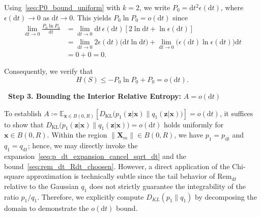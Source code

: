 \documentclass[
 longbibliography,
 twocolumn,
 superscriptaddress,
 amsmath,
 amssymb,
 amsthm,
 amsfonts,
 prl,
 floatfix,
]{revtex4-2}
\begin{document}
\begin{widetext}
Using~\eqref{seq:P0_bound_uniform} with $k=2$, we write $P_0=\mathrm dt^2\epsilon(\mathrm dt)$, where $\epsilon(\mathrm dt)\rightarrow0$ as $\mathrm dt\rightarrow 0$.
This yields $P_0\ln P_0=o(\mathrm dt)$ since
\begin{equation}
\begin{aligned}
    \lim_{\mathrm dt\rightarrow 0}
    \frac{P_0\ln P_0}{\mathrm dt}
    &=\lim_{\mathrm dt\rightarrow 0}
    \mathrm dt\,\epsilon(\mathrm dt)
    \left[2\ln\mathrm dt+\ln\epsilon(\mathrm dt)\right]
    \\
    &=\lim_{\mathrm dt\rightarrow 0}
    2\epsilon(\mathrm dt)\big(\mathrm dt\ln\mathrm dt)
    +\lim_{\mathrm dt\rightarrow 0}
    \big(\epsilon(\mathrm dt)\ln\epsilon(\mathrm dt)\big)\mathrm dt
    \\
    &=0+0=0.
    \label{seq:P0lnP0_odt}
\end{aligned}
\end{equation}

Consequently, we verify that
\begin{equation}
    H(S)\leq -P_0\ln P_0+P_0=o(\mathrm dt).
    \label{seq:H(S)_odt}
\end{equation}

\bigskip
\noindent\textbf{\textbullet\ Step 3. Bounding the Interior Relative Entropy:} $A=o(\mathrm dt)$

To establish $A\coloneq\mathbb E_{\bm x\in B(0,R)}\!\left[D_{\mathrm{KL}}\big(p_1(\bm z|\bm x)\|q_1(\bm z|\bm x)\big)\right]=o(\mathrm dt)$, it suffices to show that $D_{\mathrm{KL}}\big(p_1(\bm z|\bm x)\|q_1(\bm z|\bm x)\big)=o(\mathrm dt)$ holds uniformly for $\bm x\in B(0,R)$. Within the region $\|\bm X_m\|\in B(0,R)$, we have $p_1=p_{\mathrm dt}$ and $q_1=q_{\mathrm dt}$; hence, we may directly invoke the expansion~\eqref{seq:p_dt_expansion_cancel_sqrt_dt} and the bound~\eqref{seq:rem_dt_Rdt_choosen}. However, a direct application of the Chi-square approximation is technically subtle since the tail behavior of $\mathrm{Rem}_{\mathrm dt}$ relative to the Gaussian $q_1$ does not strictly guarantee the integrability of the ratio $p_1/q_1$. Therefore, we explicitly compute $D_{KL}(p_1\|q_1)$ by decomposing the domain to demonstrate the $o(\mathrm dt)$ bound.


\end{widetext}
\end{document}
